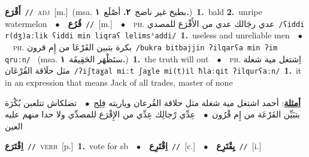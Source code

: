 \documentclass[10pt,a4paper,twoside]{article} %
\begin{document}
\begin{multicols}{2}
{\setlength\topsep{0pt}\textbf{\foreignlanguage{arabic}{أَقْرَع}}\ {\color{gray}\texttt{//}\color{black}}\ \textsc{adj}\ [m.]\ \color{gray}(msa. \foreignlanguage{arabic}{بطيخ غير ناضج}~\foreignlanguage{arabic}{\textbf{٢.}}  \foreignlanguage{arabic}{أصْلَع}~\foreignlanguage{arabic}{\textbf{١.}})\color{black}\ \textbf{1.}~bald  \textbf{2.}~unripe watermelon\ \ $\bullet$\ \ \setlength\topsep{0pt}\textbf{\foreignlanguage{arabic}{قُرُع}}\ {\color{gray}\texttt{//}\color{black}}\ [m.]\ \ $\bullet$\ \ \textsc{ph.} \color{gray} \foreignlanguage{arabic}{عدي رجَالك عدي من الأَقْرَع للمصدي}\color{black}\ {\color{gray}\texttt{/{\sffamily ʕiddi r(dʒ)aːlik ʕiddi min liqraʕ lelimsˤaddi}/}\color{black}}\ \textbf{1.}~useless and unreliable men\ \ $\bullet$\ \ \textsc{ph.} \color{gray} \foreignlanguage{arabic}{بكرة بتبين القَرْعَا من إِم قرون}\color{black}\ {\color{gray}\texttt{/{\sffamily bukra bitbajjin ʔilqarʕa min ʔim qruːn}/}\color{black}}\ \color{gray} (msa. \foreignlanguage{arabic}{ستَظْهَر الحَقِيقَة}~\foreignlanguage{arabic}{\textbf{١.}})\color{black}\ \textbf{1.}~the truth will out\ \ $\bullet$\ \ \textsc{ph.} \color{gray} \foreignlanguage{arabic}{اِشتغل مية شغلة مثل حلَاقة القُرْعَان}\color{black}\ {\color{gray}\texttt{/{\sffamily ʔiʃtaɣal miːt ʃaɣle mi(t)il ħlaːqit ʔilqurʕaːn}/}\color{black}}\ \textbf{1.}~it in an expression that means Jack of all trades, master of none\  \begin{flushright}\color{gray}\foreignlanguage{arabic}{\textbf{\underline{\foreignlanguage{arabic}{أمثلة}}}: أحمد اشتغل مية شغلة مثل حلاقة القُرعان وياريته فِلِح\ $\bullet$\ \  تضلكاش تتلعبن بُكْرَة بتبَيِّن القَرْعَة من إِم قْرُون\ $\bullet$\ \  عِدِّي رْجالِك عِدِّي من الإِقْرَع للمصدِّي ولا حدا منهم عليه العين}\end{flushright}\color{black}} \vspace{2mm}

{\setlength\topsep{0pt}\textbf{\foreignlanguage{arabic}{اِقْتَرَع}}\ {\color{gray}\texttt{//}\color{black}}\ \textsc{verb}\ [p.]\ \textbf{1.}~vote for sb\ \ $\bullet$\ \ \setlength\topsep{0pt}\textbf{\foreignlanguage{arabic}{اِقْتَرِع}}\ {\color{gray}\texttt{//}\color{black}}\ [c.]\ \ $\bullet$\ \ \setlength\topsep{0pt}\textbf{\foreignlanguage{arabic}{يِقْتَرِع}}\ {\color{gray}\texttt{//}\color{black}}\ [i.]\ } \vspace{2mm}


\end{multicols}
\end{document}
